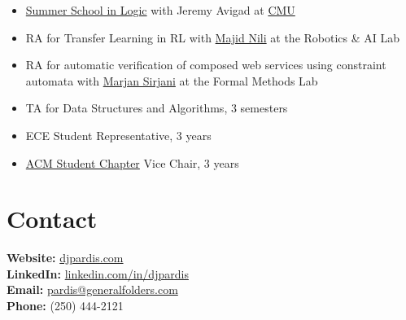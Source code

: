 \documentclass[11pt,letterpaper]{article}
\begin{document}
\begin{itemize}
    \item \href{https://www.cmu.edu/dietrich/philosophy/undergraduate/summer-school/index.html}{Summer School in Logic} with Jeremy Avigad at \href{https://www.cmu.edu/}{CMU}
    \item RA for Transfer Learning in RL with \href{https://www.ipm.ac.ir/personalinfo.jsp?PeopleCode=IP0000028}{Majid Nili} at the Robotics \& AI Lab
    \item RA for automatic verification of composed web services using constraint automata with \href{https://www.es.mdu.se/staff/3242-Marjan_Sirjani}{Marjan Sirjani} at the Formal Methods Lab
    \item TA for Data Structures and Algorithms, 3 semesters
    \item ECE Student Representative, 3 years
    \item \href{https://www.linkedin.com/company/ut-acm/}{ACM Student Chapter} Vice Chair, 3 years
\end{itemize}

\section*{Contact}

\textbf{Website:} \href{https://djpardis.com}{djpardis.com}\\
\textbf{LinkedIn:} \href{https://linkedin.com/in/djpardis}{linkedin.com/in/djpardis}\\
\textbf{Email:} \href{mailto:pardis@generalfolders.com}{pardis@generalfolders.com}\\
\textbf{Phone:} (250) 444-2121
\end{document}

